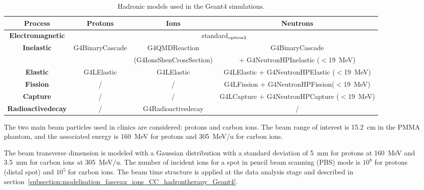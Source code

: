 
\begin{table}
\label{physlist_ion}
\caption{Hadronic models used in the Geant4 simulations.}
\begin{scriptsize}
\begin{center}
\renewcommand{\arraystretch}{1.2}
\begin{tabular} {cccc}\hline
\textbf{Process} & \textbf{Protons} & \textbf{Ions} & \textbf{Neutrons} \\ \hline 
\textbf{Electromagnetic} & \multicolumn{3}{c}{standard$_{\rm{option3}}$} \\ %
\textbf{Inelastic} & G4BinaryCascade & G4QMDReaction  &  G4BinaryCascade  \\ 
 & & (G4IonsShenCrossSection)&+ G4NeutronHPInelastic ($<$19~MeV)\\ %
\textbf{Elastic} & G4LElastic & G4LElastic & G4LElastic + G4NeutronHPElastic ($<$19~MeV)\\ %
\textbf{Fission} & / & / & G4LFission + G4NeutronHPFission($<$19~MeV) \\ %
\textbf{Capture} & / & / & G4LCapture +  G4NeutronHPCapture ($<$19~MeV) \\ %
\textbf{Radioactivedecay} & / & G4Radioactivedecay & / \\ \hline
\end{tabular}
\end{center}
\end{scriptsize}
\label{table:table_modele_physic_CC_simulation_Hadronth}
\end{table}

The two main beam particles used in clinics are considered: protons and carbon ions. The beam range of interest is 15.2~cm in the PMMA phantom, and the associated energy is 160~MeV for protons and 305~MeV/u for carbon ions.
 
The beam transverse dimension is modeled with a Gaussian distribution with a standard deviation of 5~mm for protons at 160~MeV and 3.5~mm for carbon ions at 305~MeV/u. The number of incident ions for a spot in pencil beam scanning (PBS) mode is $10^8$ for protons (distal spot) and $10^5$ for carbon ions. The beam time structure is applied at the data analysis stage and described in section~\ref{subsection:modelisation_fasceau_ions_CC_hadrontherapy_Geant4}.


